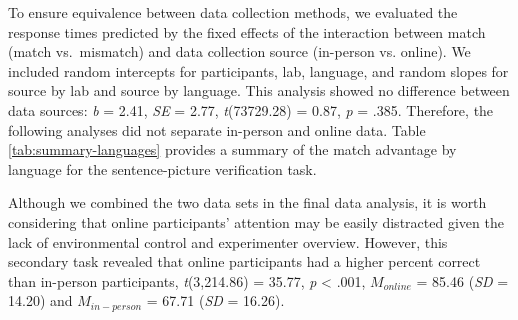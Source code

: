 \documentclass[
  man,mask,floatsintext]{apa7}
\begin{document}
To ensure equivalence between data collection methods, we evaluated the
response times predicted by the fixed effects of the interaction between
match (match vs.~mismatch) and data collection source (in-person vs.
online). We included random intercepts for participants, lab, language,
and random slopes for source by lab and source by language. This
analysis showed no difference between data sources: \emph{b} =
2.41,
\emph{SE} =
2.77,
\emph{t}(73729.28)
=
0.87,
\emph{p} = .385. Therefore, the
following analyses did not separate in-person and online data. Table
\ref{tab:summary-languages} provides a summary of the match advantage
by language for the sentence-picture verification task.

Although we combined the two data sets in the final data analysis, it is
worth considering that online participants' attention may be easily
distracted given the lack of environmental control and experimenter
overview. However, this secondary task revealed that online participants
had a higher percent correct than in-person participants,
\emph{t}(3,214.86) = 35.77, \emph{p}
\textless{} .001, \(M_{online}\) =
85.46
(\emph{SD} =
14.20)
and \(M_{in-person}\) =
67.71
(\emph{SD} =
16.26).
\end{document}
